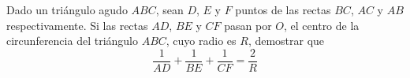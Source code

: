 Dado un triángulo agudo $ABC$, sean $D$, $E$ y $F$ puntos de las rectas $BC$, $AC$ y $AB$ respectivamente. Si las rectas $AD$, $BE$ y $CF$ pasan por $O$, el centro de la circunferencia del triángulo $ABC$, cuyo radio es $R$, demostrar que
\[\frac{1}{AD}+\frac{1}{BE}+\frac{1}{CF}=\frac{2}{R}\]
